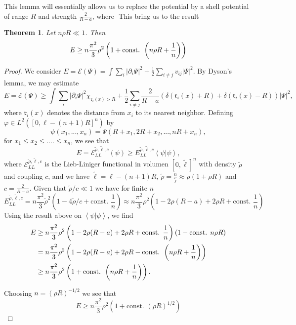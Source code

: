 \documentclass[a4paper,11pt]{article}
\newcommand{\abs}[1]{\left\lvert #1 \right\rvert}
\renewcommand{\braket}[1]{\left\langle#1\right\rangle}
\newtheorem{theorem}{Theorem}
\numberwithin{equation}{section}
\begin{document}
	This lemma will essentially allows us to replace the potential by a shell potential of range $ R $ and strength $ \frac{2}{R-a} $, where $  $
	 This bring us to the result \begin{theorem}
		Let $ n\rho R\ll 1 $. Then\begin{equation}
		E\geq n\frac{\pi^2}{3}\rho^2\left(1+\textnormal{const. }\left(n\rho R+\frac{1}{n}\right)\right)
		\end{equation}
	\end{theorem}
	\begin{proof}
		We consider $ E=\mathcal{E}(\Psi)=\int\sum_{i}\abs{\partial_i\Psi}^2+\frac{1}{2}\sum_{i\neq j}v_{ij}\abs{\Psi}^2 $. By Dyson's lemma, we may estimate\begin{equation}
		E=\mathcal{E}(\Psi)\geq \int\sum_{i}\abs{\partial_i\Psi}^2\chi_{\mathfrak{r}_i(x)>R}+\frac{1}{2}\sum_{i\neq j}\frac{2}{R-a}(\delta(\mathfrak{r}_i(x)+R)+\delta(\mathfrak{r}_i(x)-R))\abs{\Psi}^2,
		\end{equation}
		where $ \mathfrak{r}_i(x) $ denotes the distance from $ x_i $ to its nearest neighbor. Defining $ \varphi\in L^2([0,\ell-(n+1)R]^n) $ by $$ \psi(x_1,...,x_n)=\Psi(R+x_1,2R+x_2,...,nR+x_n), $$
		for $ x_1\leq x_2\leq....\leq x_n $, we see that \begin{equation}
		E=\mathcal{E}_{LL}^{\tilde{\rho},\tilde{\ell},c}(\psi)\geq E_{LL}^{\tilde{\rho},\tilde{\ell},c}\braket{\psi|\psi},
		\end{equation}
		where $ \mathcal{E}_{LL}^{\tilde{\rho},\tilde{\ell},c} $ is the Lieb-Liniger functional in volumen $ [0,\tilde{\ell}]^n $ with density $ \tilde{\rho} $ and coupling $ c $, and we have $ \tilde{\ell}=\ell-(n+1)R $, $ \tilde{\rho}=\frac{n}{\tilde{\ell}}\approx\rho (1+\rho R) $ and $ c=\frac{2}{R-a} $. Given that $ \tilde{\rho}/c\ll 1 $ we have for finite $ n $ \begin{equation}
		E_{LL}^{\tilde{\rho},\tilde{\ell},c}=n\frac{\pi^2}{3}\tilde{\rho}^2\left(1-4\tilde{\rho}/c+\text{const. }\frac{1}{n}\right)\approx n\frac{\pi^2}{3}\rho^2\left(1-2\rho(R-a)+2\rho R+\text{const. }\frac{1}{n}\right)
		\end{equation}
		Using the result above on $ \braket{\psi|\psi} $, we find \begin{equation}
		\begin{aligned}
		E&\geq n\frac{\pi^2}{3}\rho^2\left(1-2\rho(R-a)+2\rho R+\text{const. }\frac{1}{n}\right)(1-\text{const. }n\rho R)\\&=n\frac{\pi^2}{3}\rho^2\left(1-2\rho(R-a)+2\rho R-\text{const. }\left(n\rho R+\frac{1}{n}\right)\right)\\
		&\geq n\frac{\pi^2}{3}\rho^2\left(1+\textnormal{const. }\left(n\rho R+\frac{1}{n}\right)\right).
		\end{aligned}
		\end{equation}
		
		Choosing $ n=(\rho R)^{-1/2} $ we see that \begin{equation}
		E\geq n\frac{\pi^2}{3}\rho^2(1+\text{const. }(\rho R)^{1/2})
		\end{equation}
	\end{proof}
	
\end{document}
